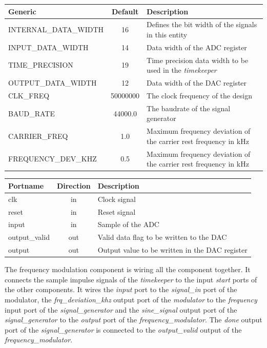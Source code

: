 \begin{adjustwidth}{-2.6cm}{}
	\begin{center}
		\begin{tabular}{ | l | c | l | }
			\hline
			\textbf{Generic} & \textbf{Default} & \textbf{Description} \\ \hline
			INTERNAL\_DATA\_WIDTH & 16 & Defines the bit width of the signals in this entity \\
			INPUT\_DATA\_WIDTH & 14 & Data width of the ADC register \\
			TIME\_PRECISION & 19 & Time precision data width to be used in the \textit{timekeeper} \\
			OUTPUT\_DATA\_WIDTH & 12 & Data width of the DAC register \\
			CLK\_FREQ & 50000000 & The clock frequency of the design \\
			BAUD\_RATE & 44000.0 & The baudrate of the signal generator \\
			CARRIER\_FREQ & 1.0 & Maximum frequency deviation of the carrier rest frequency in kHz \\
			FREQUENCY\_DEV\_KHZ & 0.5 & Maximum frequency deviation of the carrier rest frequency in kHz \\
			\hline
		\end{tabular} 
	\end{center}
\end{adjustwidth}

\begin{center}
	\begin{tabular}{ | l | c | l | }
		\hline
		\textbf{Portname} & \textbf{Direction} & \textbf{Description} \\
		\hline
		clk & in & Clock signal \\
		reset & in  & Reset signal \\
		input & in  & Sample of the ADC \\
		output\_valid & out  & Valid data flag to be written to the DAC \\
		output & out  & Output value to be written in the DAC register \\
		\hline
	\end{tabular} 
\end{center}

The frequency modulation component is wiring all the component together. It connects the sample impulse signals of the \textit{timekeeper} to the input \textit{start} ports of the other components. It wires the \textit{input} port to the \textit{signal\_in} port of the modulator, the \textit{frq\_deviation\_khz} output port of the \textit{modulator} to the \textit{frequency} input port of the \textit{signal\_generator} and the \textit{sine\_signal} output port of the \textit{signal\_generator} to the \textit{output} port of the \textit{frequency\_modulator}. The \textit{done} output port of the \textit{signal\_generator} is connected to the \textit{output\_valid} output of the \textit{frequency\_modulator}.




